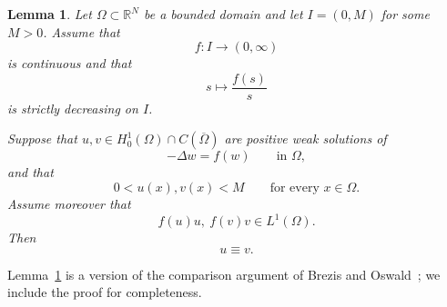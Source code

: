\documentclass[11pt]{article}
\newcommand{\add}[1]{{\color{blue}#1}}
\newtheorem{lemma}[theorem]{Lemma}
\theoremstyle{definition}
\begin{document}
\begin{lemma}
\label{lem:picone-comparison}
Let $\Omega\subset\mathbb R^N$ be a bounded domain and let
$I=(0,M)$ for some $M>0$. Assume that
\[
f:I\longrightarrow(0,\infty)
\]
is continuous and that
\[
s\longmapsto\frac{f(s)}{s}
\]
is strictly decreasing on $I$.

Suppose that $u,v\in H_0^1(\Omega)\cap C(\overline\Omega)$ are
positive weak solutions of
\[
-\Delta w=f(w)
\qquad\text{in }\Omega,
\]
and that
\[
0<u(x),v(x)<M
\qquad\text{for every }x\in\Omega.
\]
Assume moreover that
\[
f(u)u,\ f(v)v\in L^1(\Omega).
\]
Then
\[
u\equiv v.
\]
\end{lemma}

\add{Lemma~\ref{lem:picone-comparison} is a version of the comparison
argument of Brezis and Oswald~\cite{BrezisOswald}; we include the proof
for completeness.}
\end{document}

